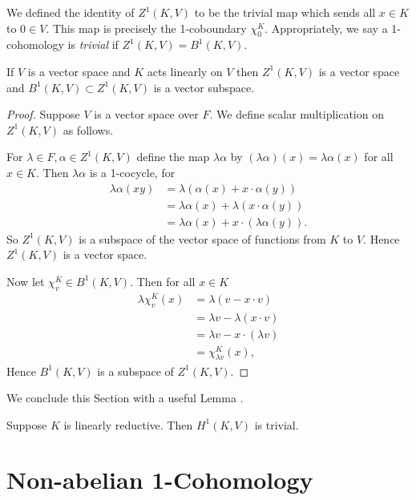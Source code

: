 \begin{remark}\label{identity}
	We defined the identity of $Z^1(K, V)$ to be the trivial map which sends all $x \in K$ to $0 \in V$. This map is precisely the 1-coboundary $\chi^K_0$. Appropriately, we say a 1-cohomology is \emph{trivial} if $Z^1(K, V) = B^1(K, V)$.
\end{remark}

\begin{lemma} \label{vspace} If $V$ is a vector space and $K$ acts linearly on $V$ then $Z^1(K, V)$ is a vector space and $B^1(K, V)\subset Z^1(K, V)$ is a vector subspace.
\end{lemma}
\begin{proof}
	Suppose $V$ is a vector space over $F$. We define scalar multiplication on $Z^1(K, V)$ as follows.

For $\lambda \in F, \alpha \in Z^1(K, V)$ define the map $\lambda\alpha$ by $(\lambda\alpha)(x) = \lambda\alpha(x)$ for all $x \in K$. Then $\lambda\alpha$ is a 1-cocycle, for
\begin{align*}
	\lambda \alpha(xy) &= \lambda\left( \alpha(x) + x \cdot \alpha(y)\right) \\
	&= \lambda\alpha(x) + \lambda(x\cdot \alpha(y)) \\
	&= \lambda\alpha(x) + x \cdot (\lambda\alpha(y)).
\end{align*}
So $Z^1(K, V)$ is a subspace of the vector space of functions from $K$ to $V$. Hence $Z^1(K, V)$ is a vector space.

Now let $\chi^K_v \in B^1(K, V)$. Then for all $x \in K$
\begin{align*}
	\lambda\chi^K_v(x) &= \lambda\left(v - x \cdot v\right) \\
		&= \lambda v - \lambda(x \cdot v) \\
		&= \lambda v - x \cdot (\lambda v) \\
		&= \chi^K_{\lambda v}(x),
\end{align*}
Hence $B^1(K, V)$ is a subspace of $Z^1(K, V)$.
\end{proof}

We conclude this Section with a useful Lemma \cite[Proposition 1]{kemper2000characterization}.
\begin{lemma} Suppose $K$ is linearly reductive. Then $H^1(K, V)$ is trivial.
  \label{lem:lin_red_h}
\end{lemma}

\section{Non-abelian 1-Cohomology}
	
